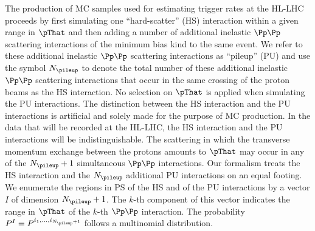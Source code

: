 The production of MC samples used for estimating trigger rates at the HL-LHC
proceeds by first simulating one ``hard-scatter'' (HS) interaction within a given range in $\pThat$
and then adding a number of additional inelastic $\Pp\Pp$ scattering interactions of the minimum bias kind to the same event.
We refer to these additional inelastic $\Pp\Pp$ scattering interactions as ``pileup'' (PU)
and use the symbol $N_{\pileup}$ to denote the total number of these additional inelastic $\Pp\Pp$ scattering interactions 
that occur in the same crossing of the proton beams as the HS interaction.
No selection on $\pThat$ is applied when simulating the PU interactions.
The distinction between the HS interaction and the PU interactions is artificial and solely made for the purpose of MC production.
In the data that will be recorded at the HL-LHC, the HS interaction and the PU interactions will be indistinguishable.
The scattering in which the transverse momentum exchange between the protons amounts to $\pThat$ may occur in any of the $N_{\pileup} + 1$ simultaneous $\Pp\Pp$ interactions.
Our formalism treats the HS interaction and the $N_{\pileup}$ additional PU interactions on an equal footing.
We enumerate the regions in PS of the HS and of the PU interactions by a vector $I$ of dimension $N_{\pileup} + 1$.
The $k$-th component of this vector indicates the range in $\pThat$ of the $k$-th $\Pp\Pp$ interaction.
The probability $P^{I} = P^{i_{1},\dots,i_{N_{\pileup}+1}}$ follows a multinomial distribution.



